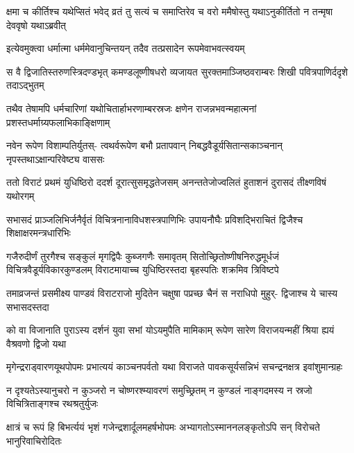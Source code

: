 \fourlineindentedshloka
{क्षमा च कीर्तिश्च यथेप्सितं भवेद्}
{व्रतं तु सत्यं च समाप्तिरेव च}
{वरो ममैषोस्तु यथाऽनुकीर्तितो}
{न तन्मृषा देववृषो यथाऽब्रवीत्}



\twolineshloka
{इत्येवमुक्त्वा धर्मात्मा धर्ममेवानुचिन्तयन्}
{तदैव तत्प्रसादेन रूपमेवाभवत्स्वयम्}


\fourlineindentedshloka
{स वै द्विजातिस्तरुणस्त्रिदण्डभृत्}
{कमण्डलूष्णीषधरो व्यजायत}
{सुरक्तमाञ्जिष्ठवराम्बरः शिखी}
{पवित्रपाणिर्ददृशे तदाऽद्भुतम्}


\fourlineindentedshloka
{तथैव तेषामपि धर्मचारिणां}
{यथोचितार्हाभरणाम्बरस्रजः}
{क्षणेन राजन्नभवन्महात्मनां}
{प्रशस्तधर्माग्र्यफलाभिकाङ्क्षिणाम्}


\fourlineindentedshloka
{नवेन रूपेण विशाम्पतिर्युतस्-}
{त्वथर्वरूपेण बभौ प्रतापवान्}
{निबद्धवैडूर्यसितान्सकाञ्चनान्}
{नृपस्तथाऽक्षान्परिवेष्ट्य वाससः}


\fourlineindentedshloka
{ततो विराटं प्रथमं युधिष्ठिरो}
{ददर्श दूरात्सुसमृद्धतेजसम्}
{अनन्ततेजोज्वलितं हुताशनं}
{दुरासदं तीक्ष्णविषं यथोरगम्}


\fourlineindentedshloka
{सभासदं प्राञ्जलिभिर्जनैर्वृतं}
{विचित्रनानाविधशस्त्रपाणिभिः}
{उपायनौघैः प्रविशद्भिराचितं}
{द्विजैश्च शिक्षाक्षरमन्त्रधारिभिः}



\sixlineindentedshloka
{गजैरुदीर्णं तुरगैश्च सङ्कुलं}
{मृगद्विपैः कुब्जगणैः समावृतम्}
{सितोच्छ्रितोष्णीषनिरुद्धमूर्धजं}
{विचित्रवैडूर्यविकारकुण्डलम्}
{विराटमायाच्च युधिष्ठिरस्तदा}
{बृहस्पतिः शक्रमिव त्रिविष्टपे}


\fourlineindentedshloka
{तमाव्रजन्तं प्रसमीक्ष्य पाण्डवं}
{विराटराजो मुदितेन चक्षुषा}
{पप्रच्छ चैनं स नराधिपो मुहुर्-}
{द्विजाश्च ये चास्य सभासदस्तदा}




\fourlineindentedshloka
{को वा विजानाति पुराऽस्य दर्शनं}
{युवा सभां योऽयमुपैति मामिकाम्}
{रूपेण सारेण विराजयन्महीं}
{श्रिया ह्ययं वैश्रवणो द्विजो यथा}


\fourlineindentedshloka
{मृगेन्द्रराड्वारणयूथपोपमः}
{प्रभात्ययं काञ्चनपर्वतो यथा}
{विराजते पावकसूर्यसन्निभं}
{सचन्द्रनक्षत्र इवांशुमान्ग्रहः}


\fourlineindentedshloka
{न दृश्यतेऽस्यानुचरो न कुञ्जरो}
{न चोष्णरश्म्यावरणं समुच्छ्रितम्}
{न कुण्डलं नाङ्गदमस्य न स्रजो}
{विचित्रिताङ्गश्च रथश्रतुर्युजः}


\fourlineindentedshloka
{क्षात्रं च रूपं हि बिभर्त्ययं भृशं}
{गजेन्द्रशार्दूलमहर्षभोपमः}
{अभ्यागतोऽस्माननलङ्कृतोऽपि सन्}
{विरोचते भानुरिवाचिरोदितः}


